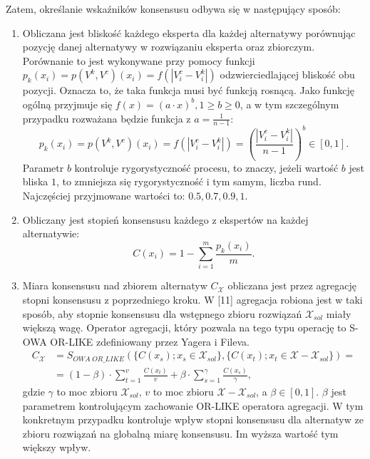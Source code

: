 Zatem, określanie wskaźników konsensusu odbywa się w następujący sposób:
\begin{enumerate}
  \item Obliczana jest bliskość każdego eksperta dla każdej alternatywy
  porównując pozycję danej alternatywy w rozwiązaniu eksperta oraz zbiorczym.
  Porównanie to jest wykonywane przy pomocy funkcji $p_k(x_i) = p(V^k,V^c)(x_i)
  = f(|V^c_i - V^k_i|)$ odzwierciedlającej bliskość obu pozycji. Oznacza to, że
  taka funkcja musi być funkcją rosnącą. Jako funkcję ogólną przyjmuje się
  $f(x) = (a \cdot x)^b, 1 \geq b \geq 0$, a w tym szczególnym przypadku
  rozważana będzie funkcja z $a = \frac{1}{n-1}$:
  \begin{equation}
  p_k(x_i) = p(V^k,V^c)(x_i) = f(|V^c_i - V^k_i|) = (\frac{|V^c_i -
  V^k_i|}{n-1})^b \in [0,1].
  \end{equation}
  Parametr $b$ kontroluje rygorystyczność procesu, to znaczy, jeżeli wartość $b$
  jest bliska $1$, to zmniejsza się rygorystyczność i tym samym, liczba rund.
  Najczęściej przyjmowane wartości to: $0.5, 0.7, 0.9, 1$.
  
  \item Obliczany jest stopień konsensusu każdego z ekspertów na każdej
  alternatywie:
  \begin{equation}
  C(x_i) = 1 - \sum_{i=1}^{m} \frac{p_k(x_i)}{m}.
  \end{equation}
  
  \item Miara konsensusu nad zbiorem alternatyw $C_{\mathcal{X}}$ obliczana jest
  przez agregację stopni konsensusu z poprzedniego kroku. W [11] agregacja
  robiona jest w taki sposób, aby stopnie konsensusu dla wstępnego zbioru
  rozwiązań $\mathcal{X}_{sol}$ miały większą wagę. Operator agregacji, który
  pozwala na tego typu operację to S-OWA OR-LIKE zdefiniowany przez Yagera i
  Fileva.
  \begin{equation}
  \begin{split}
  C_{\mathcal{X}} &= S_{OWA \; OR\_LIKE}(\{ C(x_s); x_s \in
  \mathcal{X}_{sol}\}, \{ C(x_t); x_t \in \mathcal{X} - \mathcal{X}_{sol} \}) =
  \\ 
  &= (1 - \beta)\cdot \sum_{t=1}^{v} \frac{C(x_t)}{v} + \beta \cdot
  \sum_{s=1}^{\gamma} \frac{C(x_s)}{\gamma},
  \end{split}
  \end{equation}
  gdzie $\gamma$ to moc zbioru $\mathcal{X}_{sol}$, $v$ to moc zbioru
  $\mathcal{X} - \mathcal{X}_{sol}$, a $\beta \in [0,1].$ $\beta$ jest
  parametrem kontrolującym zachowanie OR-LIKE operatora agregacji. W tym
  konkretnym przypadku kontroluje wpływ stopni konsensusu dla alternatyw ze
  zbioru rozwiązań na globalną miarę konsensusu. Im wyższa wartość tym większy
  wpływ.
  

\end{enumerate}
